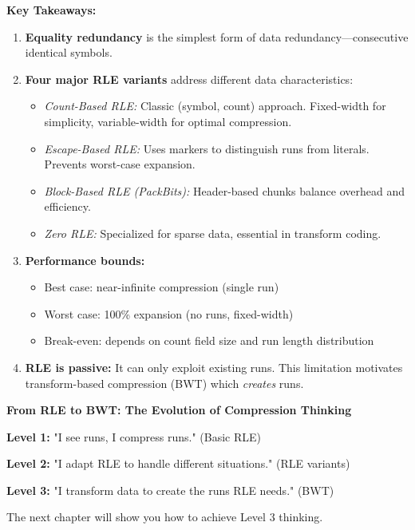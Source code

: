 \begin{importantbox}
\textbf{Key Takeaways:}

\begin{enumerate}
    \item \textbf{Equality redundancy} is the simplest form of data redundancy—consecutive identical symbols.
    
    \item \textbf{Four major RLE variants} address different data characteristics:
    \begin{itemize}
        \item \textit{Count-Based RLE:} Classic (symbol, count) approach. Fixed-width for simplicity, variable-width for optimal compression.
        \item \textit{Escape-Based RLE:} Uses markers to distinguish runs from literals. Prevents worst-case expansion.
        \item \textit{Block-Based RLE (PackBits):} Header-based chunks balance overhead and efficiency.
        \item \textit{Zero RLE:} Specialized for sparse data, essential in transform coding.
    \end{itemize}
    
    \item \textbf{Performance bounds:}
    \begin{itemize}
        \item Best case: near-infinite compression (single run)
        \item Worst case: 100\% expansion (no runs, fixed-width)
        \item Break-even: depends on count field size and run length distribution
    \end{itemize}
    
    \item \textbf{RLE is passive:} It can only exploit existing runs. This limitation motivates transform-based compression (BWT) which \textit{creates} runs.
\end{enumerate}
\end{importantbox}

\begin{tcolorbox}[colback=orange!10!white,colframe=orange!50!black, title=Preview: The Burrows-Wheeler Transform]
\begin{center}
\textbf{From RLE to BWT: The Evolution of Compression Thinking}

\vspace{0.3cm}
\textbf{Level 1:} "I see runs, I compress runs." (Basic RLE)

\vspace{0.2cm}
\textbf{Level 2:} "I adapt RLE to handle different situations." (RLE variants)

\vspace{0.2cm}
\textbf{Level 3:} "I transform data to create the runs RLE needs." (BWT)

\vspace{0.3cm}
The next chapter will show you how to achieve Level 3 thinking.
\end{center}
\end{tcolorbox}

